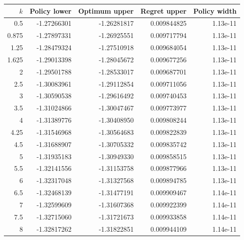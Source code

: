 \begin{tabular}{rrrrr}
\toprule
$k$ & Policy lower & Optimum upper & Regret upper & Policy width \\
\midrule
0.5 & -1.27266301 & -1.26281817 & 0.009844825 & 1.13e-11 \\
0.875 & -1.27897331 & -1.26925551 & 0.009717794 & 1.13e-11 \\
1.25 & -1.28479324 & -1.27510918 & 0.009684054 & 1.13e-11 \\
1.625 & -1.29013398 & -1.28045672 & 0.009677256 & 1.13e-11 \\
2 & -1.29501788 & -1.28533017 & 0.009687701 & 1.13e-11 \\
2.5 & -1.30083961 & -1.29112854 & 0.009711056 & 1.13e-11 \\
3 & -1.30590538 & -1.29616492 & 0.009740453 & 1.13e-11 \\
3.5 & -1.31024866 & -1.30047467 & 0.009773977 & 1.13e-11 \\
4 & -1.31389776 & -1.30408950 & 0.009808244 & 1.13e-11 \\
4.25 & -1.31546968 & -1.30564683 & 0.009822839 & 1.13e-11 \\
4.5 & -1.31688907 & -1.30705332 & 0.009835742 & 1.13e-11 \\
5 & -1.31935183 & -1.30949330 & 0.009858515 & 1.13e-11 \\
5.5 & -1.32141556 & -1.31153758 & 0.009877966 & 1.13e-11 \\
6 & -1.32317048 & -1.31327568 & 0.009894785 & 1.13e-11 \\
6.5 & -1.32468139 & -1.31477191 & 0.009909467 & 1.14e-11 \\
7 & -1.32599609 & -1.31607368 & 0.009922399 & 1.14e-11 \\
7.5 & -1.32715060 & -1.31721673 & 0.009933858 & 1.14e-11 \\
8 & -1.32817262 & -1.31822851 & 0.009944109 & 1.14e-11 \\
\bottomrule
\end{tabular}

